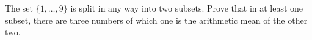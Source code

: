 The set $\{1, \ldots, 9\}$ is split in any way into two subsets. Prove that in at least one subset, there are three numbers of which one is the arithmetic mean of the other two.
